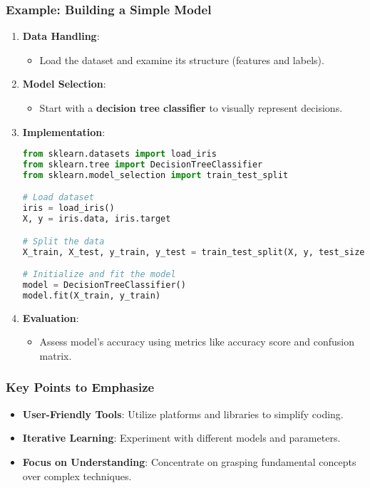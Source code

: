 \documentclass[aspectratio=169]{beamer}
\begin{document}
\begin{frame}[fragile]
    \frametitle{Example: Building a Simple Model}
    \begin{enumerate}
        \item \textbf{Data Handling}:
            \begin{itemize}
                \item Load the dataset and examine its structure (features and labels).
            \end{itemize}
        \item \textbf{Model Selection}:
            \begin{itemize}
                \item Start with a \textbf{decision tree classifier} to visually represent decisions.
            \end{itemize}
        \item \textbf{Implementation}:
            \begin{lstlisting}[language=Python]
from sklearn.datasets import load_iris
from sklearn.tree import DecisionTreeClassifier
from sklearn.model_selection import train_test_split

# Load dataset
iris = load_iris()
X, y = iris.data, iris.target

# Split the data
X_train, X_test, y_train, y_test = train_test_split(X, y, test_size=0.2)

# Initialize and fit the model
model = DecisionTreeClassifier()
model.fit(X_train, y_train)
            \end{lstlisting}
        \item \textbf{Evaluation}:
            \begin{itemize}
                \item Assess model’s accuracy using metrics like accuracy score and confusion matrix.
            \end{itemize}
    \end{enumerate}
\end{frame}

\begin{frame}[fragile]
    \frametitle{Key Points to Emphasize}
    \begin{itemize}
        \item \textbf{User-Friendly Tools}: Utilize platforms and libraries to simplify coding.
        \item \textbf{Iterative Learning}: Experiment with different models and parameters.
        \item \textbf{Focus on Understanding}: Concentrate on grasping fundamental concepts over complex techniques.
    \end{itemize}
\end{frame}
\end{document}
